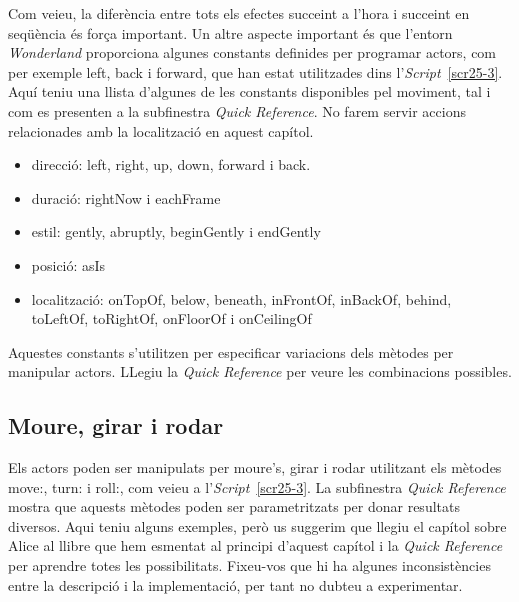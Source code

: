 Com veieu, la diferència entre tots els efectes succeint a l'hora i succeint en seqüència és força important. Un altre aspecte important és que l'entorn \emph{Wonderland} proporciona algunes constants definides per programar actors, com per exemple \textsf{left}, \textsf{back} i \textsf{forward}, que han estat utilitzades dins l'\emph{Script}~\ref{scr25-3}. Aquí teniu una llista d'algunes de les constants disponibles pel moviment, tal i com es presenten a la subfinestra \emph{Quick Reference}. No farem servir accions relacionades amb la localització en aquest capítol.   

\begin{itemize}
\item direcció: \textsf{left}, \textsf{right}, \textsf{up}, \textsf{down}, \textsf{forward} i \textsf{back}.
\item duració: \textsf{rightNow} i \textsf{eachFrame}
\item estil: \textsf{gently}, \textsf{abruptly}, \textsf{beginGently} i \textsf{endGently}
\item posició: \textsf{asIs}
\item localització: \textsf{onTopOf}, \textsf{below}, \textsf{beneath}, \textsf{inFrontOf}, \textsf{inBackOf}, \textsf{behind}, \textsf{toLeftOf}, \textsf{toRightOf}, \textsf{onFloorOf} i \textsf{onCeilingOf} 
\end{itemize}

Aquestes constants s'utilitzen per especificar variacions dels mètodes per manipular actors. LLegiu la \emph{Quick Reference} per veure les combinacions possibles.

\subsection{Moure, girar i rodar}
Els actors poden ser manipulats per moure's, girar i rodar utilitzant els mètodes \textsf{move:}, \textsf{turn:} i \textsf{roll:}, com veieu a l'\emph{Script}~\ref{scr25-3}. La subfinestra \emph{Quick Reference} mostra que aquests mètodes poden ser parametritzats per donar resultats diversos. Aqui teniu alguns exemples, però us suggerim que llegiu el capítol sobre Alice al llibre que hem esmentat al principi d'aquest capítol i la \emph{Quick Reference} per aprendre totes les possibilitats. Fixeu-vos que hi ha algunes inconsistències entre la descripció i la implementació, per tant no dubteu a experimentar.  


